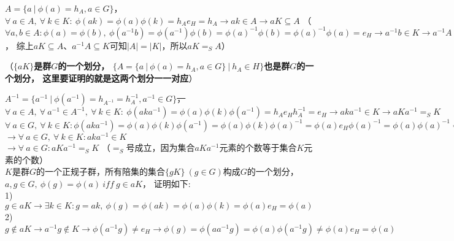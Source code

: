 $A=\{a\ |\ \phi(a)=h_{A}, a\in G\}$，
$\forall\ a\in A,\ \forall\ k\in K:\ \phi(ak)=\phi(a)\phi(k)=h_{A}e_{H}=h_{A}
\rightarrow ak\in A
\rightarrow aK\subseteq A$
（$\forall a,b\in A:\phi(a)=\phi(b),
\ \phi(a^{-1}b)=\phi(a^{-1})\phi(b)=\phi(a)^{-1}\phi(b)=\phi(a)^{-1}\phi(a)=e_{H}
\rightarrow a^{-1}b\in K
\rightarrow a^{-1}A\subseteq K$，
综上$aK\subseteq A$、$a^{-1}A\subseteq K$可知$|A|=|K|$，所以$aK=_{S}A$）

（\textbf{$\{aK\}$是群$G$的一个划分，
$\{A=\{a\ |\ \phi(a)=h_{A}, a\in G\}\ |\ h_{A}\in H\}$也是群$G$的一个划分，
这里要证明的就是这两个划分一一对应}）

\sout{
$A^{-1}=\{a^{-1}\ |\ \phi(a^{-1})=h_{A^{-1}}=h_{A}^{-1}, a^{-1}\in G\}$，
$\forall\ a\in A,\ \forall\ a^{-1}\in A^{-1},\ \forall\ k\in K:\ \phi(aka^{-1})=\phi(a)\phi(k)\phi(a^{-1})=h_{A}e_{H}h_{A}^{-1}=e_{H}
\rightarrow aka^{-1}\in K
\rightarrow aKa^{-1}=_{S} K$
}
$\forall\ a\in G,\ \forall\ k\in K:\phi(aka^{-1})=\phi(a)\phi(k)\phi(a^{-1})=\phi(a)\phi(k)\phi(a)^{-1}=\phi(a)e_{H}\phi(a)^{-1}=\phi(a)\phi(a)^{-1}=e_{H}$\\
$\rightarrow\forall\ a\in G,\ \forall\ k\in K:aka^{-1}\in K$\\
$\rightarrow\forall\ a\in G:aKa^{-1}=_{S} K$
（$=_{S}$号成立，因为集合$aKa^{-1}$元素的个数等于集合$K$元素的个数）
\\

$K$是群$G$的一个正规子群，所有陪集的集合$\{gK\}\ (g\in G)$构成$G$的一个划分，
$a,g\in G,\ \phi(g)=\phi(a)\ iff\ g\in aK$，
证明如下:
\\
1)$g\in aK\rightarrow \exists k\in K:g=ak,\ \phi(g)=\phi(ak)=\phi(a)\phi(k)=\phi(a)e_{H}=\phi(a)$
\\
2)$g\notin aK\rightarrow a^{-1}g\notin K\rightarrow \phi(a^{-1}g)\neq e_{H}
\rightarrow \phi(g)=\phi(aa^{-1}g)=\phi(a)\phi(a^{-1}g)\neq \phi(a)e_{H}=\phi(a)$

